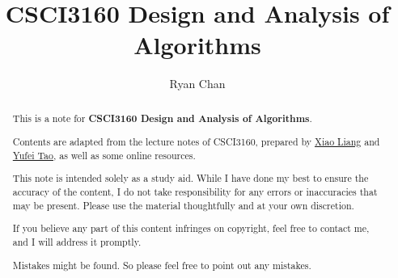 \documentclass[a4paper]{report}
\author{Ryan Chan}
\title{CSCI3160 Design and Analysis of Algorithms}
\begin{document}
\setlength\parindent{0pt}

\maketitle

\newpage

\begin{abstract}
	This is a note for \textbf{CSCI3160 Design and Analysis of Algorithms}. 
	
	Contents are adapted from the lecture notes of CSCI3160, prepared by \href{https://xiao-liang.github.io}{Xiao Liang} and \href{https://www.cse.cuhk.edu.hk/~taoyf/}{Yufei Tao}, as well as some online resources.
	
	This note is intended solely as a study aid. While I have done my best to ensure the accuracy of the content, I do not take responsibility for any errors or inaccuracies that may be present. Please use the material thoughtfully and at your own discretion.
	
	If you believe any part of this content infringes on copyright, feel free to contact me, and I will address it promptly.
	
	Mistakes might be found. So please feel free to point out any mistakes.
\end{abstract}

\newpage

\tableofcontents

\setlength{\parskip}{5pt}

\newpage

\appendix

\end{document}
